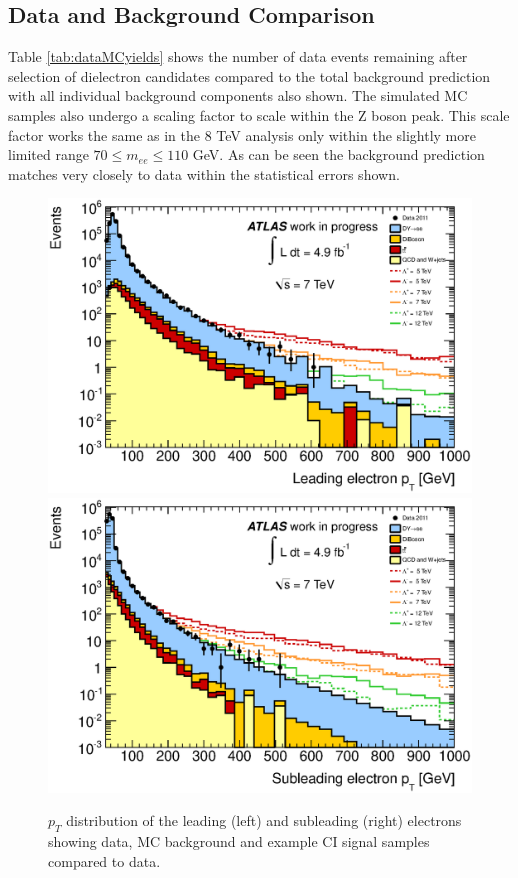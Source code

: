 \subsection{Data and Background Comparison}

	Table \ref{tab:dataMCyields} shows the number of data events remaining after selection of dielectron candidates compared to the total background prediction with all individual background components also shown. The simulated MC samples also undergo a scaling factor to scale within the Z boson peak. This scale factor works the same as in the 8 TeV analysis only within the slightly more limited range $70 \leq m_{ee} \leq 110$ GeV. As can be seen the background prediction matches very closely to data within the statistical errors shown.


	\begin{figure}[h!]
	\centering
	\includegraphics[width=0.49\linewidth]{images/lead_pT.eps}
	\includegraphics[width=0.49\linewidth]{images/sub_pT.eps}
	\caption{$p_{T}$ distribution of the leading (left) and subleading (right) electrons showing data, MC background and example CI signal samples compared to data.}
	\label{fig:CIpT}
	\end{figure}

